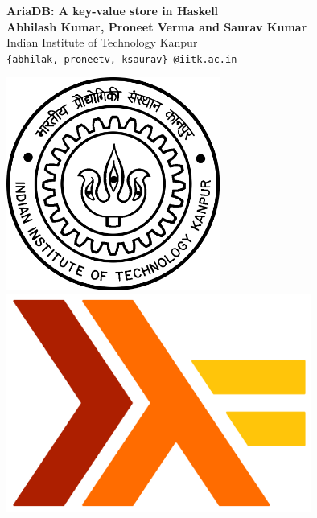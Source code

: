 \documentclass[a0,portrait]{a0poster}
\begin{document}
\begin{minipage}[b]{0.75\linewidth}
\VeryHuge \color{NavyBlue}\textbf{AriaDB: A key-value store in Haskell}\color{Black}\\[2.0cm]
\huge \textbf{Abhilash Kumar, Proneet Verma and Saurav Kumar}\\[0.8cm]
\huge Indian Institute of Technology Kanpur \\[0.4cm] 
\Large \texttt{\{abhilak, proneetv, ksaurav\} @iitk.ac.in}\\
\end{minipage}
% 
\begin{minipage}[b]{0.25\linewidth}
\includegraphics[width=7cm]{iitk.png}\ 
\includegraphics[width=10cm]{haskell.png}\\
\end{minipage}
\vspace{1cm} %

\end{document}
